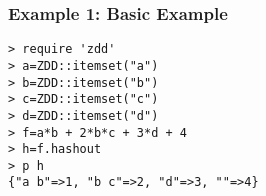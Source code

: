 \subsubsection*{Example 1: Basic Example}



\begin{Verbatim}[baselinestretch=0.7,frame=single]
> require 'zdd'
> a=ZDD::itemset("a")
> b=ZDD::itemset("b")
> c=ZDD::itemset("c")
> d=ZDD::itemset("d")
> f=a*b + 2*b*c + 3*d + 4
> h=f.hashout
> p h
{"a b"=>1, "b c"=>2, "d"=>3, ""=>4}
\end{Verbatim}
